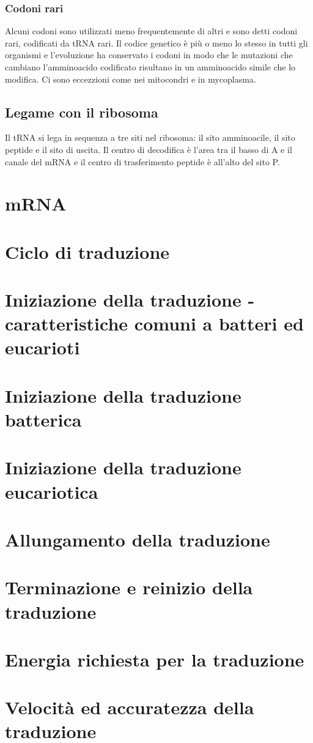 \subsubsection{Codoni rari}
Alcuni codoni sono utilizzati meno frequentemente di altri e sono detti codoni rari, codificati da tRNA rari. Il codice genetico \`e pi\`u o meno lo stesso in tutti gli organismi e l'evoluzione ha 
conservato i codoni in modo che le mutazioni che cambiano l'amminoacido codificato risultano in un amminoacido simile che lo modifica. Ci sono eccezzioni come nei mitocondri e in mycoplasma. 
\subsection{Legame con il ribosoma}
Il tRNA si lega in sequenza a tre siti nel ribosoma: il sito amminoacile, il sito peptide e il sito di uscita. Il centro di decodifica \`e l'area tra il basso di A e il canale del mRNA e il
centro di trasferimento peptide \`e all'alto del sito P.
\section{mRNA}

\section{Ciclo di traduzione}

\section{Iniziazione della traduzione - caratteristiche comuni a batteri ed eucarioti}

\section{Iniziazione della traduzione batterica}

\section{Iniziazione della traduzione eucariotica}

\section{Allungamento della traduzione}

\section{Terminazione e reinizio della traduzione}

\section{Energia richiesta per la traduzione}

\section{Velocit\`a ed accuratezza della traduzione}

